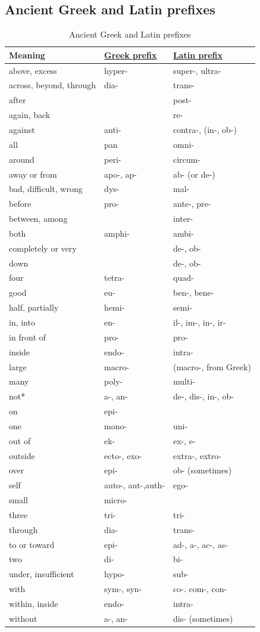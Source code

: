 \documentclass[11pt]{article}
\begin{document}
\subsection{Ancient Greek and Latin prefixes}
\label{sec:org067ba71}
\begin{table}[htbp]
\caption{\label{tab:ancient-greek-latin-prefixes}Ancient Greek and Latin prefixes}
\centering
\begin{tabular}{lll}
Meaning & \hyperref[orgbf5096c]{Greek prefix} & \hyperref[org45819ba]{Latin prefix}\\
\hline
above, excess & hyper- & super-, ultra-\\
across, beyond, through & dia- & trans-\\
after &  & post-\\
again, back &  & re-\\
against & anti- & contra-, (in-, ob-)\\
all & pan & omni-\\
around & peri- & circum-\\
away or from & apo-, ap- & ab- (or de-)\\
bad, difficult, wrong & dys- & mal-\\
before & pro- & ante-, pre-\\
between, among &  & inter-\\
both & amphi- & ambi-\\
completely or very &  & de-, ob-\\
down &  & de-, ob-\\
four & tetra- & quad-\\
good & eu- & ben-, bene-\\
half, partially & hemi- & semi-\\
in, into & en- & il-, im-, in-, ir-\\
in front of & pro- & pro-\\
inside & endo- & intra-\\
large & macro- & (macro-, from Greek)\\
many & poly- & multi-\\
not* & a-, an- & de-, dis-, in-, ob-\\
on & epi- & \\
one & mono- & uni-\\
out of & ek- & ex-, e-\\
outside & ecto-, exo- & extra-, extro-\\
over & epi- & ob- (sometimes)\\
self & auto-, aut-,auth- & ego-\\
small & micro- & \\
three & tri- & tri-\\
through & dia- & trans-\\
to or toward & epi- & ad-, a-, ac-, as-\\
two & di- & bi-\\
under, insufficient & hypo- & sub-\\
with & sym-, syn- & co-. com-, con-\\
within, inside & endo- & intra-\\
without & a-, an- & dis- (sometimes)\\
\end{tabular}
\end{table}
\end{document}
